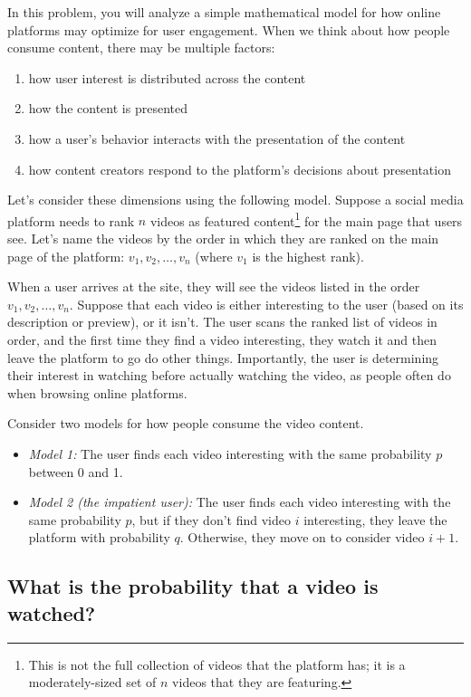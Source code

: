 \documentclass{article}
\begin{document}
In this problem, you will analyze a simple mathematical model for how online platforms may optimize for user engagement. When we think about how people consume content, there may be multiple factors:
\begin{enumerate}
    \item how user interest is distributed across the content
    \item how the content is presented
    \item how a user's behavior interacts with the presentation of the content
    \item how content creators respond to the platform's decisions about presentation
\end{enumerate}

Let's consider these dimensions using the following model. Suppose a social media platform needs to rank $n$ videos as featured content\footnote{This is not the full collection of videos that the platform has; it is a moderately-sized set of $n$ videos that they are featuring.} for the main page that users see. Let's name the videos by the order in which they are ranked on the main page of the platform: $v_1, v_2, \dots, v_n$ (where $v_1$ is the highest rank).

When a user arrives at the site, they will see the videos listed in the order $v_1, v_2, \dots, v_n$. Suppose that each video is either interesting to the user (based on its description or preview), or it isn't. The user scans the ranked list of videos in order, and the first time they find a video interesting, they watch it and then leave the platform to go do other things. Importantly, the user is determining their interest in watching before actually watching the video, as people often do when browsing online platforms.

Consider two models for how people consume the video content.
\begin{itemize}
    \item \textit{Model 1:} The user finds each video interesting with the same probability $p$ between 0 and 1. 
    \item \textit{Model 2 (the impatient user):} The user finds each video interesting with the same probability $p$, but if they don't find video $i$ interesting, they leave the platform with probability $q$. Otherwise, they move on to consider video $i+1$.
\end{itemize}

\subsection*{What is the probability that a video is watched?}
\end{document}
